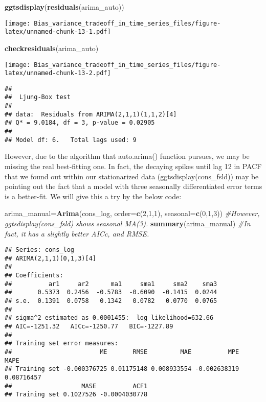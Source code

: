 \documentclass[
]{article}
\newenvironment{Shaded}{\begin{snugshade}}{\end{snugshade}}
\newcommand{\CommentTok}[1]{\textcolor[rgb]{0.56,0.35,0.01}{\textit{#1}}}
\newcommand{\DataTypeTok}[1]{\textcolor[rgb]{0.13,0.29,0.53}{#1}}
\newcommand{\DecValTok}[1]{\textcolor[rgb]{0.00,0.00,0.81}{#1}}
\newcommand{\KeywordTok}[1]{\textcolor[rgb]{0.13,0.29,0.53}{\textbf{#1}}}
\newcommand{\NormalTok}[1]{#1}
\begin{document}
\begin{Shaded}
\begin{Highlighting}[]
\KeywordTok{ggtsdisplay}\NormalTok{(}\KeywordTok{residuals}\NormalTok{(arima_auto))}
\end{Highlighting}
\end{Shaded}

\texttt{[image: Bias\_variance\_tradeoff\_in\_time\_series\_files/figure-latex/unnamed-chunk-13-1.pdf]}

\begin{Shaded}
\begin{Highlighting}[]
\KeywordTok{checkresiduals}\NormalTok{(arima_auto)}
\end{Highlighting}
\end{Shaded}

\texttt{[image: Bias\_variance\_tradeoff\_in\_time\_series\_files/figure-latex/unnamed-chunk-13-2.pdf]}

\begin{verbatim}
## 
##  Ljung-Box test
## 
## data:  Residuals from ARIMA(2,1,1)(1,1,2)[4]
## Q* = 9.0184, df = 3, p-value = 0.02905
## 
## Model df: 6.   Total lags used: 9
\end{verbatim}

However, due to the algorithm that auto.arima() function pursues, we may
be missing the real best-fitting one. In fact, the decaying spikes until
lag 12 in PACF that we found out within our stationarized data
(ggtsdisplay(cons\_fsld)) may be pointing out the fact that a model with
three seasonally differentiated error terms is a better-fit. We will
give this a try by the below code:

\begin{Shaded}
\begin{Highlighting}[]
\NormalTok{arima_manual=}\KeywordTok{Arima}\NormalTok{(cons_log, }\DataTypeTok{order=}\KeywordTok{c}\NormalTok{(}\DecValTok{2}\NormalTok{,}\DecValTok{1}\NormalTok{,}\DecValTok{1}\NormalTok{), }\DataTypeTok{seasonal=}\KeywordTok{c}\NormalTok{(}\DecValTok{0}\NormalTok{,}\DecValTok{1}\NormalTok{,}\DecValTok{3}\NormalTok{)) }\CommentTok{#However, ggtsdisplay(cons_fsld) shows seasonal MA(3).}
\KeywordTok{summary}\NormalTok{(arima_manual) }\CommentTok{#In fact, it has a slightly better AICc, and RMSE.}
\end{Highlighting}
\end{Shaded}

\begin{verbatim}
## Series: cons_log 
## ARIMA(2,1,1)(0,1,3)[4] 
## 
## Coefficients:
##          ar1     ar2      ma1     sma1     sma2    sma3
##       0.5373  0.2456  -0.5783  -0.6090  -0.1415  0.0244
## s.e.  0.1391  0.0758   0.1342   0.0782   0.0770  0.0765
## 
## sigma^2 estimated as 0.0001455:  log likelihood=632.66
## AIC=-1251.32   AICc=-1250.77   BIC=-1227.89
## 
## Training set error measures:
##                        ME       RMSE         MAE          MPE       MAPE
## Training set -0.000376725 0.01175148 0.008933554 -0.002638319 0.08716457
##                   MASE          ACF1
## Training set 0.1027526 -0.0004030778
\end{verbatim}
\end{document}
